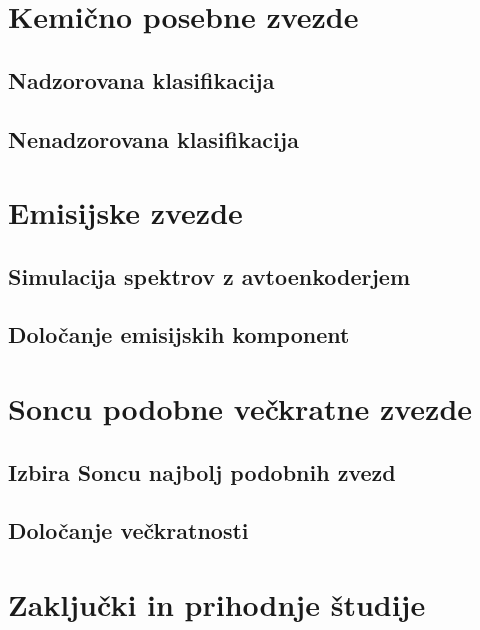 \section{Kemično posebne zvezde}
\label{sec:slo_c_peculiars}


\subsection{Nadzorovana klasifikacija}


\subsection{Nenadzorovana klasifikacija}


\section{Emisijske zvezde}
\label{sec:slo_emisijske}


\subsection{Simulacija spektrov z avtoenkoderjem}


\subsection{Določanje emisijskih komponent}


\section{Soncu podobne večkratne zvezde}
\label{sec:slo_soncevi_veckratniki}


\subsection{Izbira Soncu najbolj podobnih zvezd}


\subsection{Določanje večkratnosti}


\section{Zaključki in prihodnje študije}
\label{sec:slo_zakljucek}

